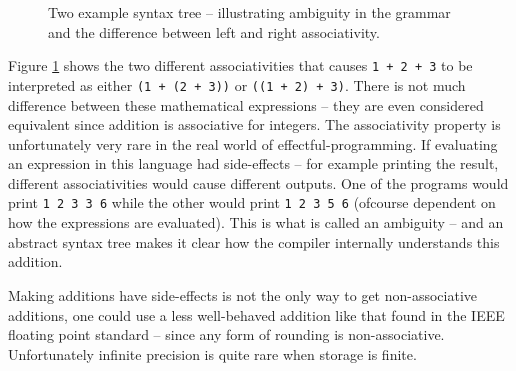 \begin{figure}
\centering
\begin{subfigure}{.5\textwidth}
\centering
{}
\end{subfigure}%
\begin{subfigure}{.5\textwidth}
\centering
{}
\end{subfigure}
  \caption{Two example syntax tree -- illustrating ambiguity in the grammar and the difference between left and right associativity.}
  \label{fig:astExpr}
\end{figure}

Figure \ref{fig:astExpr} shows the two different associativities that causes \verb!1 + 2 + 3! to be interpreted as either \verb!(1 + (2 + 3))! or \verb!((1 + 2) + 3)!. There is not much difference between these mathematical expressions -- they are even considered equivalent since addition is associative for integers. The associativity property is unfortunately very rare in the real world of effectful-programming. If evaluating an expression in this language had side-effects -- for example printing the result, different associativities would cause different outputs. One of the programs would print \verb+1 2 3 3 6+ while the other would print \verb+1 2 3 5 6+ (ofcourse dependent on how the expressions are evaluated). This is what is called an ambiguity -- and an abstract syntax tree makes it clear how the compiler internally understands this addition.

Making additions have side-effects is not the only way to get non-associative additions, one could use a less well-behaved addition like that found in the IEEE floating point standard -- since any form of rounding is non-associative. Unfortunately infinite precision is quite rare when storage is finite.

